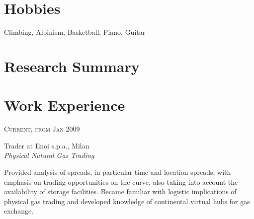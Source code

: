 \documentclass[10pt]{article} %
\begin{document}
{\begin{minipage}[t]{0.44\textwidth}
\begin{tabular}{rl}
\end{tabular}


\section{Hobbies} 

\hspace*{15pt} Climbing, Alpinism, Basketball, Piano, Guitar \\
	
\end{minipage} %
\hfill
\begin{minipage}[t]{0.5\textwidth} %
\vspace{0pt} %
	

\section{Research Summary} 


\section{Work Experience} 


{\raggedleft\textsc{Current, from Jan 2009}\par}

{\raggedright\large Trader at Enoi s.p.a., Milan\\
\textit{Physical Natural Gas Trading}\\[5pt]}

\normalsize{Provided analysis of spreads, in particular time and location spreads, with emphasis on trading opportunities on the curve, also taking into account the availability of storage facilities. Became familiar with logistic implications of physical gas trading and developed knowledge of continental virtual hubs for gas exchange.}\\


\end{minipage}}
\end{document}
